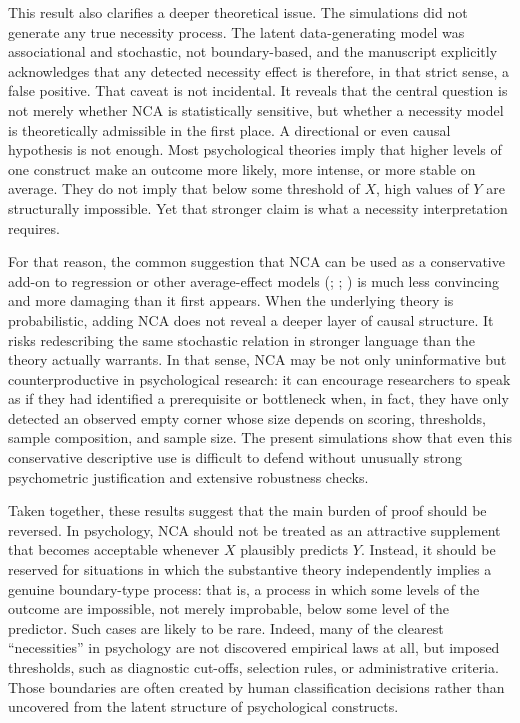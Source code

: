 \documentclass[
  man,
  longtable,
  nolmodern,
  notxfonts,
  notimes,
  colorlinks=true,linkcolor=blue,citecolor=blue,urlcolor=blue]{apa7}
\begin{document}
This result also clarifies a deeper theoretical issue. The simulations
did not generate any true necessity process. The latent data-generating
model was associational and stochastic, not boundary-based, and the
manuscript explicitly acknowledges that any detected necessity effect is
therefore, in that strict sense, a false positive. That caveat is not
incidental. It reveals that the central question is not merely whether
NCA is statistically sensitive, but whether a necessity model is
theoretically admissible in the first place. A directional or even
causal hypothesis is not enough. Most psychological theories imply that
higher levels of one construct make an outcome more likely, more
intense, or more stable on average. They do not imply that below some
threshold of \(X\), high values of \(Y\) are structurally impossible.
Yet that stronger claim is what a necessity interpretation requires.

For that reason, the common suggestion that NCA can be used as a
conservative add-on to regression or other average-effect models
(;
;
) is much less convincing and more damaging than it first appears.
When the underlying theory is probabilistic, adding NCA does not reveal
a deeper layer of causal structure. It risks redescribing the same
stochastic relation in stronger language than the theory actually
warrants. In that sense, NCA may be not only uninformative but
counterproductive in psychological research: it can encourage
researchers to speak as if they had identified a prerequisite or
bottleneck when, in fact, they have only detected an observed empty
corner whose size depends on scoring, thresholds, sample composition,
and sample size. The present simulations show that even this
conservative descriptive use is difficult to defend without unusually
strong psychometric justification and extensive robustness checks.

Taken together, these results suggest that the main burden of proof
should be reversed. In psychology, NCA should not be treated as an
attractive supplement that becomes acceptable whenever \(X\) plausibly
predicts \(Y\). Instead, it should be reserved for situations in which
the substantive theory independently implies a genuine boundary-type
process: that is, a process in which some levels of the outcome are
impossible, not merely improbable, below some level of the predictor.
Such cases are likely to be rare. Indeed, many of the clearest
``necessities'' in psychology are not discovered empirical laws at all,
but imposed thresholds, such as diagnostic cut-offs, selection rules, or
administrative criteria. Those boundaries are often created by human
classification decisions rather than uncovered from the latent structure
of psychological constructs.
\end{document}
